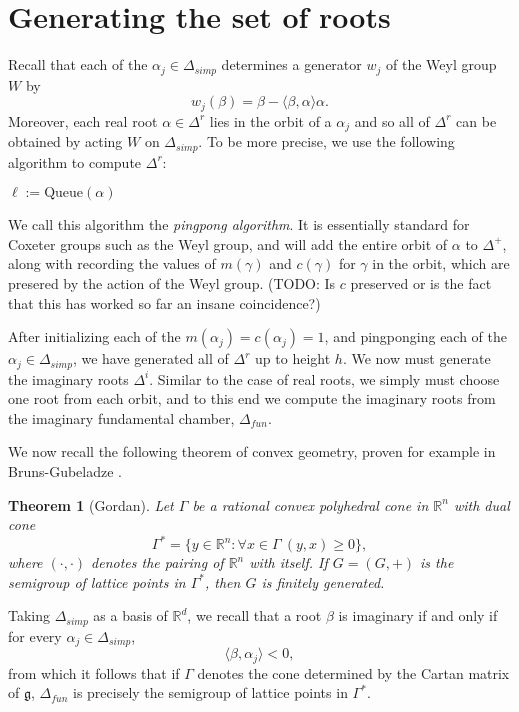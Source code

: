 \documentclass[12pt]{report}
\newcommand{\RR}{\mathbb{R}}
\newcommand{\g}{\mathfrak g}
\newcommand{\dfn}[1]{\emph{#1}\index{#1}}
\newtheorem{theorem}{Theorem}[chapter]
\theoremstyle{definition}
\begin{document}
\section{Generating the set of roots}
Recall that each of the $\alpha_j \in \Delta_{simp}$ determines a generator $w_j$ of the Weyl group $W$ by
$$w_j(\beta) = \beta - \langle \beta, \alpha\rangle \alpha.$$
Moreover, each real root $\alpha \in \Delta^r$ lies in the orbit of a $\alpha_j$ and so all of $\Delta^r$ can be obtained by acting $W$ on $\Delta_{simp}$. To be more precise, we use the following algorithm to compute $\Delta^r$:
\begin{algorithm}[H]
	$\ell := \text{Queue}(\alpha)$\;
\end{algorithm}
We call this algorithm the \dfn{pingpong algorithm}. It is essentially standard for Coxeter groups such as the Weyl group, and will add the entire orbit of $\alpha$ to $\Delta^+$, along with recording the values of $m(\gamma)$ and $c(\gamma)$ for $\gamma$ in the orbit, which are presered by the action of the Weyl group. (TODO: Is $c$ preserved or is the fact that this has worked so far an insane coincidence?)

After initializing each of the $m(\alpha_j) = c(\alpha_j) = 1$, and pingponging each of the $\alpha_j \in \Delta_{simp}$, we have generated all of $\Delta^r$ up to height $h$. We now must generate the imaginary roots $\Delta^i$. Similar to the case of real roots, we simply must choose one root from each orbit, and to this end we compute the imaginary roots from the imaginary fundamental chamber, $\Delta_{fun}$.

We now recall the following theorem of convex geometry, proven for example in Bruns-Gubeladze \cite{bruns2009polytopes}.
\begin{theorem}[Gordan]
	Let $\Gamma$ be a rational convex polyhedral cone in $\RR^n$ with dual cone
	$$\Gamma^* = \{y \in \RR^n: \forall x \in \Gamma ~(y, x) \geq 0\},$$
	where $(\cdot, \cdot)$ denotes the pairing of $\RR^n$ with itself. If $G = (G, +)$ is the semigroup of lattice points in $\Gamma^*$, then $G$ is finitely generated.
\end{theorem}
Taking $\Delta_{simp}$ as a basis of $\RR^d$, we recall that a root $\beta$ is imaginary if and only if for every $\alpha_j \in \Delta_{simp}$,
$$\langle \beta, \alpha_j\rangle < 0,$$
from which it follows that if $\Gamma$ denotes the cone determined by the Cartan matrix of $\g$, $\Delta_{fun}$ is precisely the semigroup of lattice points in $\Gamma^*$.
\end{document}
